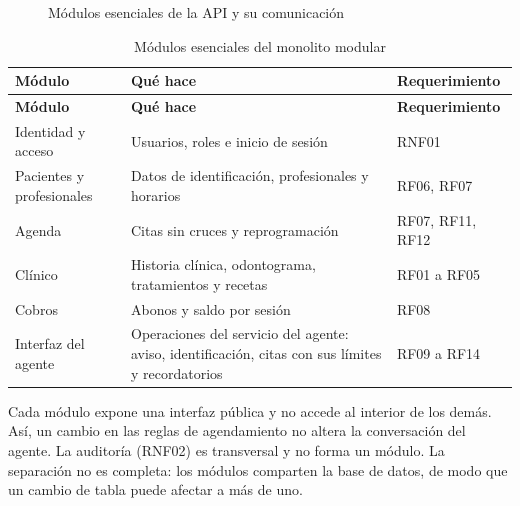 \begin{figure}[H]
\caption{Módulos esenciales de la API y su comunicación}
\label{fig:ob2_modulos}
\end{figure}

\begingroup
\fontsize{9}{11}\selectfont
\renewcommand{\arraystretch}{1.2}
\setlength{\LTpre}{0pt}\setlength{\LTpost}{6pt}
\setlength{\tabcolsep}{4pt}
\begin{xltabular}{\linewidth}{|>{\raggedright\arraybackslash}p{3.6cm}|>{\raggedright\arraybackslash}X|>{\raggedright\arraybackslash}p{2.2cm}|}
\caption{Módulos esenciales del monolito modular}
\label{tab:ob2_modulos} \\
\hline
\textbf{Módulo} & \textbf{Qué hace} & \textbf{Requerimiento} \\ \hline
\endfirsthead
\hline
\textbf{Módulo} & \textbf{Qué hace} & \textbf{Requerimiento} \\ \hline
\endhead
Identidad y acceso & Usuarios, roles e inicio de sesión & RNF01 \\ \hline
Pacientes y profesionales & Datos de identificación, profesionales y horarios & RF06, RF07 \\ \hline
Agenda & Citas sin cruces y reprogramación & RF07, RF11, RF12 \\ \hline
Clínico & Historia clínica, odontograma, tratamientos y recetas & RF01 a RF05 \\ \hline
Cobros & Abonos y saldo por sesión & RF08 \\ \hline
Interfaz del agente & Operaciones del servicio del agente: aviso, identificación, citas con sus límites y recordatorios & RF09 a RF14 \\ \hline
\end{xltabular}
\endgroup

Cada módulo expone una interfaz pública y no accede al interior de los demás. Así, un cambio en las reglas de agendamiento no altera la conversación del agente. La auditoría (RNF02) es transversal y no forma un módulo. La separación no es completa: los módulos comparten la base de datos, de modo que un cambio de tabla puede afectar a más de uno.

